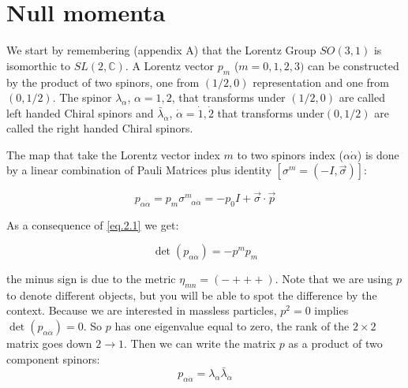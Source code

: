 








\section{Null momenta}


We start by remembering (appendix A) that the Lorentz Group $SO(3,1) $ is isomorthic to $SL(2,\mathbb{C})$. A Lorentz vector  $p_{m}$ ($m= 0,1,2,3)$ can be constructed by the product of two spinors, one from $(1/2,0)$ representation and one from $(0,1/2)$. The spinor $\lambda_{\alpha}$, $\alpha= 1,2$, that transforms under $(1/2,0)$ are called left handed Chiral spinors and $\bar{\lambda}_{\dot{\alpha}}$, $\dot{\alpha} = \dot{1},\dot{2}$ that transforms under$(0,1/2)$ are called the right handed Chiral spinors.

The map that take the Lorentz vector index $m$  to two spinors index ($\alpha\dot{\alpha}$)  is done by a linear combination of Pauli Matrices plus identity $[\sigma^{m}=(-I,\vec{\sigma})]$:

\begin{equation}
p_{\alpha\dot{\alpha}} = p_{m}\sigma^{m}_{\;\;\;\alpha\dot{\alpha}} = -p_{0}I +\vec{\sigma}\cdot \vec{p} 
\label{eq.2.1}
\end{equation}   

As a consequence of  \eqref{eq.2.1} we get:


\begin{equation}
\det(p_{\alpha\dot{\alpha}}) = -p^{m}p_{m} 
\end{equation}
     
the minus sign is due to the metric $\eta_{mn}= (-+++)$. Note that we are using $p$ to denote different objects, but you will be able to spot the difference by the context. Because we are interested in massless particles, $p^{2} = 0$ implies $\det(p_{\alpha\dot{\alpha}}) =0$. So $p$ has one eigenvalue equal to zero, the rank of the $2\times2$ matrix goes down $2\rightarrow 1$.	Then we can write the matrix $p$ as a product of two component spinors:
\begin{equation}
 p_{\alpha\dot{\alpha}} = \lambda_{\alpha} \bar{\lambda}_{\dot{\alpha}}
 \label{eq.2.2}
\end{equation}

